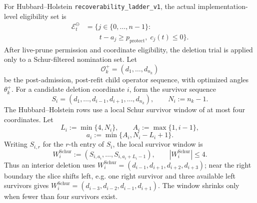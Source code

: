 \documentclass[
  reprint,
  amsmath,
  amssymb,
  aps,
  pra,
  nofootinbib,
  superscriptaddress,
  floatfix
]{revtex4-2}
\begin{document}
For Hubbard--Holstein \texttt{recoverability\_ladder\_v1}, the actual implementation-level eligibility set is
\[
\begin{aligned}
\mathcal E_t^{\ominus}
&=
\bigl\{
j\in\{0,\ldots,n-1\}:
\\[-0.25ex]
&\qquad
t-a_j\ge p_{\mathrm{protect}},
\;c_j(t)\le 0
\bigr\}.
\end{aligned}
\]
After live-prune permission and coordinate eligibility, the deletion trial is applied only to a Schur-filtered nomination set.  Let
\[
\mathcal O_k^+=(d_1,\ldots,d_{n_k})
\]
be the post-admission, post-refit child operator sequence, with optimized angles \(\theta_k^+\).  For a candidate deletion coordinate \(i\), form the survivor sequence
\[
S_i=(d_1,\ldots,d_{i-1},d_{i+1},\ldots,d_{n_k}),
\qquad
N_i:=n_k-1 .
\]
The Hubbard--Holstein rows use a local Schur survivor window of at most four coordinates.  Let
\[
L_i:=\min\{4,N_i\},
\qquad
A_i:=\max\{1,i-1\},
\]
\[
a_i:=\min\{A_i,N_i-L_i+1\}.
\]
Writing \(S_{i,r}\) for the \(r\)-th entry of \(S_i\), the local survivor window is
\[
W_i^{\mathrm{Schur}}
:=
(S_{i,a_i},\ldots,S_{i,a_i+L_i-1}),
\qquad
|W_i^{\mathrm{Schur}}|\le 4 .
\]
Thus an interior deletion uses
\(W_i^{\mathrm{Schur}}=(d_{i-1},d_{i+1},d_{i+2},d_{i+3})\); near the right boundary the slice shifts left, e.g. one right survivor and three available left survivors gives \(W_i^{\mathrm{Schur}}=(d_{i-3},d_{i-2},d_{i-1},d_{i+1})\).  The window shrinks only when fewer than four survivors exist.
\end{document}
